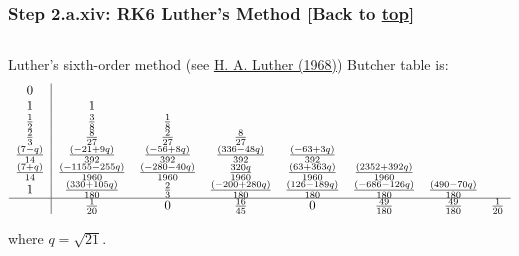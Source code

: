 \documentclass[landscape,letterpaper,10pt,english]{article}
\begin{document}
    \hypertarget{step-2.a.xiv-rk6-luthers-method-back-to-top}{%
\subsubsection{\texorpdfstring{Step 2.a.xiv: RK6 Luther's Method {[}Back
to
\hyperref[toc]{top}{]}}{Step 2.a.xiv: RK6 Luther's Method {[}Back to {]}}}\label{step-2.a.xiv-rk6-luthers-method-back-to-top}}

\[\label{l6}\]

Luther's sixth-order method (see
\href{http://www.ams.org/journals/mcom/1968-22-102/S0025-5718-68-99876-1/S0025-5718-68-99876-1.pdf}{H.
A. Luther (1968)}) Butcher table is: \[\begin{array}{c|ccccccc}
    0 & \\
    1 & 1 & \\
    \frac{1}{2} & \frac{3}{8} & \frac{1}{8} & \\
    \frac{2}{3} & \frac{8}{27} & \frac{2}{27} & \frac{8}{27} & \\
    \frac{(7-q)}{14} & \frac{(-21 + 9q)}{392} & \frac{(-56 + 8q)}{392} & \frac{(336 - 48q)}{392} & \frac{(-63 + 3q)}{392} & \\
    \frac{(7+q)}{14} & \frac{(-1155 - 255q)}{1960} & \frac{(-280 - 40q)}{1960} & \frac{320q}{1960} & \frac{(63 + 363q)}{1960} & \frac{(2352 + 392q)}{1960}     & \\
    1 & \frac{(330 + 105q)}{180} & \frac{2}{3} & \frac{(-200 + 280q)}{180} & \frac{(126 - 189q)}{180} & \frac{(-686 - 126q)}{180} & \frac{(490 - 70q)}{180} & \\ \hline
    & \frac{1}{20} & 0 & \frac{16}{45} & 0 & \frac{49}{180} & \frac{49}{180} & \frac{1}{20}
\end{array}\]

where \(q = \sqrt{21}\).
\end{document}
